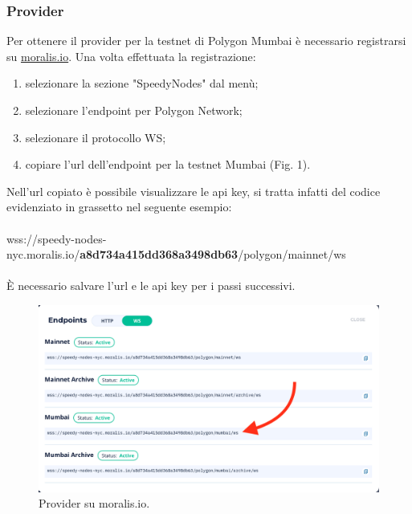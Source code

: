 \documentclass[a4paper, 12pt]{article}
\begin{document}
\subsubsection{Provider}
\label{sec:provider}
Per ottenere il provider per la testnet di Polygon Mumbai è necessario registrarsi su \href{https://www.moralis.io}{moralis.io}. Una volta effettuata la registrazione:
\begin{enumerate}
  \item selezionare la sezione "SpeedyNodes" dal menù;
  \item selezionare l'endpoint per Polygon Network;
  \item selezionare il protocollo WS;
  \item copiare l'url dell'endpoint per la testnet Mumbai (Fig. 1).
\end{enumerate}
Nell'url copiato è possibile visualizzare le api key, si tratta infatti del codice evidenziato in grassetto nel seguente esempio:\\\\
wss://speedy-nodes-nyc.moralis.io/\textbf{a8d734a415dd368a3498db63}/polygon/mainnet/ws\\\\
È necessario salvare l'url e le api key per i passi successivi.
\FloatBarrier
\begin{figure}[!h]
\centering
\includegraphics[width=0.6\linewidth]{img/moralis.png}
\caption{Provider su moralis.io.}
\end{figure}
\FloatBarrier
\end{document}
